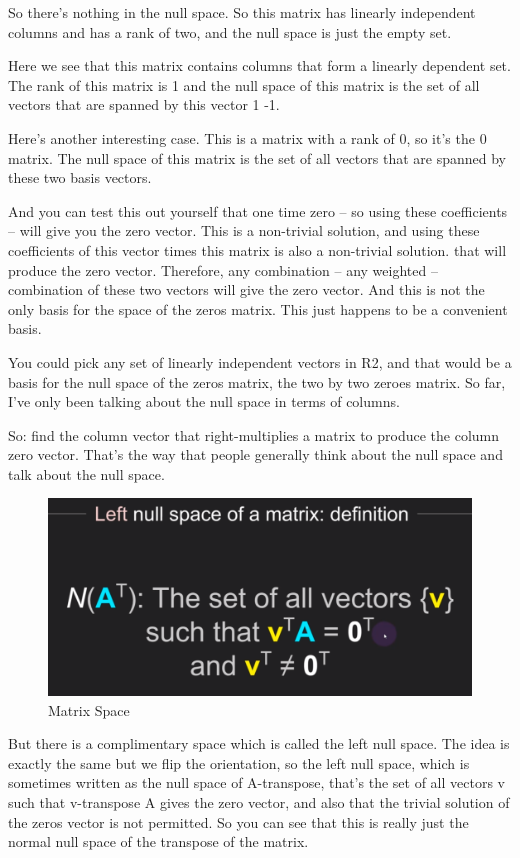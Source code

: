 \documentclass[fleqn,10pt]{olplainarticle}
\theoremstyle{definition}
\theoremstyle{remark}
\begin{document}
So there's nothing in the null space. So this matrix has linearly independent columns and has a rank of two, and the null space is just the empty set.

Here we see that this matrix contains columns that form a linearly dependent set. The rank of this matrix is 1 and the null space of this matrix is the set of all vectors that are spanned by this vector 1 -1.

Here's another interesting case. This is a matrix with a rank of 0, so it's the 0 matrix. The null space of this matrix is the set of all vectors that are spanned by these two basis vectors.

And you can test this out yourself that one time zero -- so using these coefficients -- will give you the zero vector. This is a non-trivial solution, and using these coefficients of this vector times this matrix is also a non-trivial solution. that will produce the zero vector. Therefore, any combination -- any weighted -- combination of these two vectors will give the zero vector. And this is not the only basis for the space of the zeros matrix. This just happens to be a convenient basis.

You could pick any set of linearly independent vectors in R2, and that would be a basis for the null space of the zeros matrix, the two by two zeroes matrix. So far, I've only been talking about the null space in terms of columns.

So: find the column vector that right-multiplies a matrix to produce the column zero vector. That's the way that people generally think about the null space and talk about the null space.

\begin{figure}[ht]
	\centering
	\includegraphics[width=0.3\linewidth]{images/matrix-space-23.png}
	\caption{Matrix Space}
	\label{fig:matrix_space_23}
\end{figure}

But there is a complimentary space which is called the left null space. The idea is exactly the same but we flip the orientation, so the left null space, which is sometimes written as the null space of A-transpose, that's the set of all vectors v such that v-transpose A gives the zero vector, and also that the trivial solution of the zeros vector is not permitted. So you can see that this is really just the normal null space of the transpose of the matrix.
\end{document}
